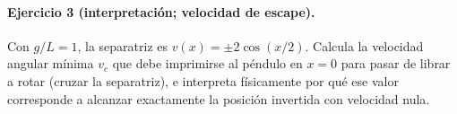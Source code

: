 \paragraph{Ejercicio 3 (interpretación; velocidad de escape).} Con $g/L=1$, la separatriz es $v(x)=\pm 2\cos(x/2)$. Calcula la velocidad angular mínima $v_c$ que debe imprimirse al péndulo en $x=0$ para pasar de librar a rotar (cruzar la separatriz), e interpreta físicamente por qué ese valor corresponde a alcanzar exactamente la posición invertida con velocidad nula.

